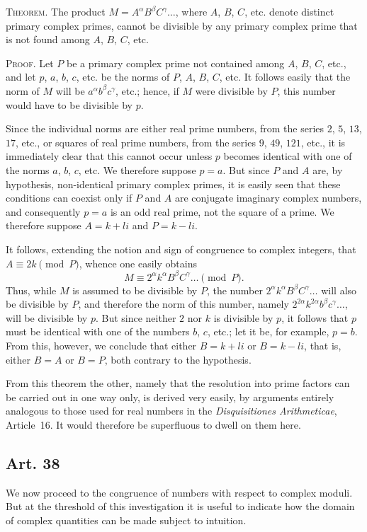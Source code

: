 \documentclass[12pt]{article}
\newcommand{\art}[1]{\subsection*{Art. #1}}
\begin{document}
\medskip
\noindent\textsc{Theorem.} The product $M=A^{\alpha}B^{\beta}C^{\gamma}\ldots$, where $A$, $B$, $C$, etc. denote distinct primary complex primes, cannot be divisible by any primary complex prime that is not found among $A$, $B$, $C$, etc.

\medskip
\noindent\textsc{Proof.} Let $P$ be a primary complex prime not contained among $A$, $B$, $C$, etc., and let $p$, $a$, $b$, $c$, etc. be the norms of $P$, $A$, $B$, $C$, etc. It follows easily that the norm of $M$ will be $a^{\alpha}b^{\beta}c^{\gamma}$, etc.; hence, if $M$ were divisible by $P$, this number would have to be divisible by $p$.

Since the individual norms are either real prime numbers, from the series $2$, $5$, $13$, $17$, etc., or squares of real prime numbers, from the series $9$, $49$, $121$, etc., it is immediately clear that this cannot occur unless $p$ becomes identical with one of the norms $a$, $b$, $c$, etc. We therefore suppose $p=a$. But since $P$ and $A$ are, by hypothesis, non-identical primary complex primes, it is easily seen that these conditions can coexist only if $P$ and $A$ are conjugate imaginary complex numbers, and consequently $p=a$ is an odd real prime, not the square of a prime. We therefore suppose $A=k+li$ and $P=k-li$.

It follows, extending the notion and sign of congruence to complex integers, that $A\equiv 2k \pmod{P}$, whence one easily obtains
\[
M\equiv 2^{\alpha}k^{\alpha}B^{\beta}C^{\gamma}\ldots \pmod{P}.
\]
Thus, while $M$ is assumed to be divisible by $P$, the number $2^{\alpha}k^{\alpha}B^{\beta}C^{\gamma}\ldots$ will also be divisible by $P$, and therefore the norm of this number, namely $2^{2\alpha}k^{2\alpha}b^{\beta}c^{\gamma}\ldots$, will be divisible by $p$. But since neither $2$ nor $k$ is divisible by $p$, it follows that $p$ must be identical with one of the numbers $b$, $c$, etc.; let it be, for example, $p=b$. From this, however, we conclude that either $B=k+li$ or $B=k-li$, that is, either $B=A$ or $B=P$, both contrary to the hypothesis.

From this theorem the other, namely that the resolution into prime factors can be carried out in one way only, is derived very easily, by arguments entirely analogous to those used for real numbers in the \textit{Disquisitiones Arithmeticae}, Article~16. It would therefore be superfluous to dwell on them here.

\art{38}

We now proceed to the congruence of numbers with respect to complex moduli. But at the threshold of this investigation it is useful to indicate how the domain of complex quantities can be made subject to intuition.
\end{document}
